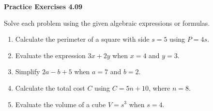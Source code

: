 \vspace{0.3ex}
\noindent\textbf{Practice Exercises 4.09}

\vspace{0.2ex}

Solve each problem using the given algebraic expressions or formulas.

\begin{enumerate}
    \item Calculate the perimeter of a square with side \(s = 5\) using \(P = 4s\).  
    \item Evaluate the expression \(3x + 2y\) when \(x = 4\) and \(y = 3\).  
    \item Simplify \(2a - b + 5\) when \(a = 7\) and \(b = 2\).  
    \item Calculate the total cost \(C\) using \(C = 5n + 10\), where \(n = 8\).  
    \item Evaluate the volume of a cube \(V = s^3\) when \(s = 4\).  
\end{enumerate}
